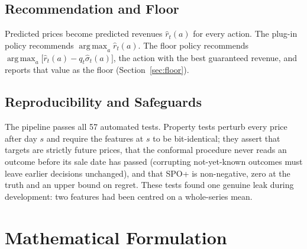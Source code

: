 \documentclass{ieeeaccess}
\DeclareMathOperator*{\argmax}{arg\,max}
\begin{document}
\subsection{Recommendation and Floor}
Predicted prices become predicted revenues $\hat r_t(a)$ for every action. The plug-in policy recommends $\argmax_a\hat r_t(a)$. The floor policy recommends $\argmax_a\bigl[\hat r_t(a)-q_t\hat\sigma_{t}(a)\bigr]$, the action with the best guaranteed revenue, and reports that value as the floor (Section~\ref{sec:floor}).

\subsection{Reproducibility and Safeguards}
The pipeline passes all 57 automated tests. Property tests perturb every price after day $s$ and require the features at $s$ to be bit-identical; they assert that targets are strictly future prices, that the conformal procedure never reads an outcome before its sale date has passed (corrupting not-yet-known outcomes must leave earlier decisions unchanged), and that SPO+ is non-negative, zero at the truth and an upper bound on regret. These tests found one genuine leak during development: two features had been centred on a whole-series mean.

\section{Mathematical Formulation}
\label{sec:method}
\end{document}
